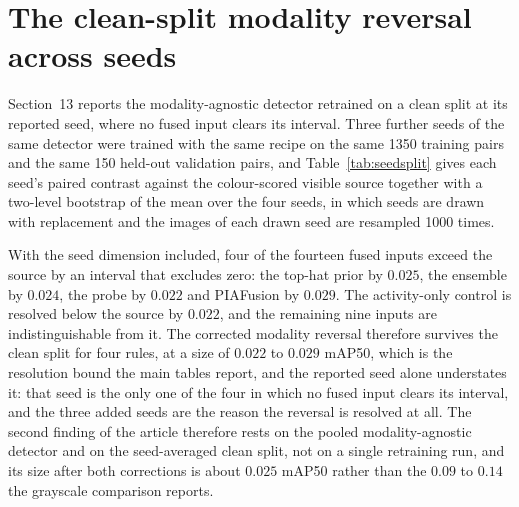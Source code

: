 \documentclass[10pt,a4paper]{article}
\begin{document}
\section{The clean-split modality reversal across seeds}

Section~13 reports the modality-agnostic detector retrained on a clean split at its
reported seed, where no fused input clears its interval. Three further seeds of the same
detector were trained with the same recipe on the same 1350 training pairs and the same
150 held-out validation pairs, and Table~\ref{tab:seedsplit} gives each seed's paired
contrast against the colour-scored visible source together with a two-level bootstrap of
the mean over the four seeds, in which seeds are drawn with replacement and the images
of each drawn seed are resampled 1000 times.

With the seed dimension included, four of the fourteen fused inputs exceed the source by
an interval that excludes zero: the top-hat prior by $0.025$, the ensemble by $0.024$,
the probe by $0.022$ and PIAFusion by $0.029$. The activity-only control is resolved
below the source by $0.022$, and the remaining nine inputs are indistinguishable from
it. The corrected modality reversal therefore survives the clean split for four rules,
at a size of $0.022$ to $0.029$ mAP50, which is the resolution bound the main tables
report, and the reported seed alone understates it: that seed is the only one of the
four in which no fused input clears its interval, and the three added seeds are the
reason the reversal is resolved at all. The second finding of the article therefore rests
on the pooled modality-agnostic detector and on the seed-averaged clean split, not on a
single retraining run, and its size after both corrections is about $0.025$ mAP50
rather than the $0.09$ to $0.14$ the grayscale comparison reports.
\end{document}
